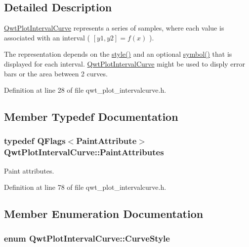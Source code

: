 \subsection{Detailed Description}
\hyperlink{class_qwt_plot_interval_curve}{Qwt\-Plot\-Interval\-Curve} represents a series of samples, where each value is associated with an interval ( $[y1,y2] = f(x)$ ). 

The representation depends on the \hyperlink{class_qwt_plot_interval_curve_ada1fea7fe0359c1bc175b3a2baf10c87}{style()} and an optional \hyperlink{class_qwt_plot_interval_curve_a178654ee5b40932b06bbfcf5cb96ca7e}{symbol()} that is displayed for each interval. \hyperlink{class_qwt_plot_interval_curve}{Qwt\-Plot\-Interval\-Curve} might be used to disply error bars or the area between 2 curves. 

Definition at line 28 of file qwt\-\_\-plot\-\_\-intervalcurve.\-h.



\subsection{Member Typedef Documentation}
\hypertarget{class_qwt_plot_interval_curve_a1fa99e81e5c1b687aec620e9b8746d6c}{
\subsubsection[{Paint\-Attributes}]{\setlength{\rightskip}{0pt plus 5cm}typedef Q\-Flags$<${\bf Paint\-Attribute}$>$ {\bf Qwt\-Plot\-Interval\-Curve\-::\-Paint\-Attributes}}}\label{class_qwt_plot_interval_curve_a1fa99e81e5c1b687aec620e9b8746d6c}


Paint attributes. 



Definition at line 78 of file qwt\-\_\-plot\-\_\-intervalcurve.\-h.



\subsection{Member Enumeration Documentation}
\hypertarget{class_qwt_plot_interval_curve_aaef834575b923e1b317f4a86b2d97cd2}{
\subsubsection[{Curve\-Style}]{\setlength{\rightskip}{0pt plus 5cm}enum {\bf Qwt\-Plot\-Interval\-Curve\-::\-Curve\-Style}}}\label{class_qwt_plot_interval_curve_aaef834575b923e1b317f4a86b2d97cd2}


